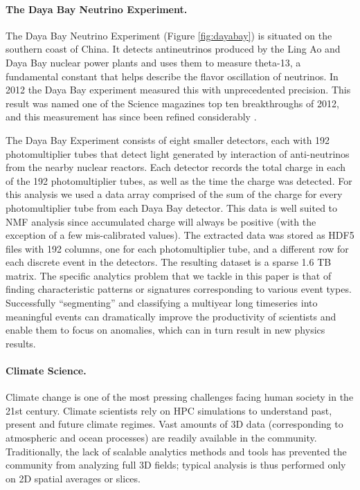 \paragraph{The Daya Bay Neutrino Experiment.}
The Daya Bay Neutrino Experiment (Figure \ref{fig:dayabay}) is situated on the southern coast of China. It detects antineutrinos produced by the Ling Ao and Daya Bay nuclear power plants and uses them to measure theta-13, a fundamental constant that helps describe the flavor oscillation of neutrinos. In 2012 the Daya Bay experiment measured this with unprecedented precision. This result was named one of the Science magazines top ten breakthroughs of 2012, and this measurement has since been refined considerably \cite{dayabay15}.

The Daya Bay Experiment consists of eight smaller detectors, each with 192 photomultiplier tubes that detect light generated by interaction of anti-neutrinos from the nearby nuclear reactors. Each detector records the total charge in each of the 192 photomultiplier tubes, as well as the time the charge was detected. For this analysis we used a data array comprised of the sum of the charge for every photomultiplier tube from each Daya Bay detector. This data is well suited to NMF analysis since accumulated charge will always be positive (with the exception of a few mis-calibrated values). The extracted data was stored as HDF5 files with 192 columns, one for each photomultiplier tube, and a different row for each discrete event in the detectors. The resulting dataset is a sparse 1.6 TB matrix. The specific analytics problem that we tackle in this paper is that of finding characteristic patterns or signatures corresponding to various event types. Successfully ``segmenting'' and classifying a multiyear long timeseries into meaningful events can dramatically improve the productivity of scientists and enable them to focus on anomalies, which can in turn result in new physics results.

\paragraph{Climate Science.}
Climate change is one of the most pressing challenges facing human society in the 21st century. Climate scientists rely on HPC simulations to understand past, present and future climate regimes. Vast amounts of 3D data (corresponding to atmospheric and ocean processes) are readily available in the community. Traditionally, the lack of scalable analytics methods and tools has prevented the community from analyzing full 3D fields; typical analysis is thus performed only on 2D spatial averages or slices. 

